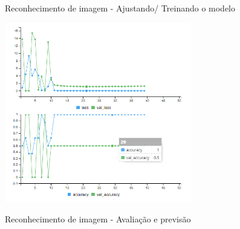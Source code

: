 \documentclass[
  ignorenonframetext,
]{beamer}
\newenvironment{Shaded}{\begin{snugshade}}{\end{snugshade}}
\newcommand{\DataTypeTok}[1]{\textcolor[rgb]{0.13,0.29,0.53}{#1}}
\newcommand{\KeywordTok}[1]{\textcolor[rgb]{0.13,0.29,0.53}{\textbf{#1}}}
\newcommand{\NormalTok}[1]{#1}
\newcommand{\OperatorTok}[1]{\textcolor[rgb]{0.81,0.36,0.00}{\textbf{#1}}}
\newcommand{\StringTok}[1]{\textcolor[rgb]{0.31,0.60,0.02}{#1}}
\begin{document}
\begin{frame}{Reconhecimento de imagem - Ajustando/ Treinando o modelo}
\protect\hypertarget{reconhecimento-de-imagem---ajustando-treinando-o-modelo-1}{}

\includegraphics[width=3.2in]{IMAGENS/modelo_grafico}

\begin{center}
\tiny{}
\end{center}

\end{frame}

\begin{frame}[fragile]{Reconhecimento de imagem - Avaliação e previsão}
\protect\hypertarget{reconhecimento-de-imagem---avaliauxe7uxe3o-e-previsuxe3o}{}

\begin{Shaded}
\end{Shaded}

\end{frame}
\end{document}
